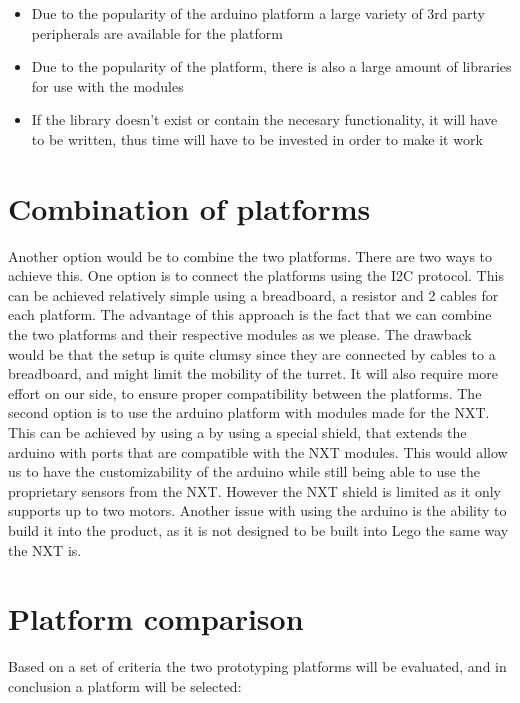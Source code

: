 \begin{itemize}
	\item Due to the popularity of the arduino platform a large variety of 3rd
	party peripherals are available for the platform \Source
	\item Due to the popularity of the platform, there is also a large amount of
	libraries for use with the modules \Source
	\item If the library doesn't exist or contain the necesary functionality, it
	will have to be written, thus time will have to be invested in order to make
	it work
\end{itemize}

\section{Combination of platforms}
Another option would be to combine the two platforms. There are two ways to achieve this.
One option is to connect the platforms using the I2C protocol. This can be achieved relatively
simple using a breadboard, a resistor and 2 cables for each platform. The advantage of this
approach is the fact that we can combine the two platforms and their respective modules as we please.
The drawback would be that the setup is quite clumsy since they are connected by cables to a breadboard,
and might limit the mobility of the turret. It will also require more effort on our side, to ensure proper
compatibility between the platforms.
The second option is to use the arduino platform with modules made for the NXT.
This can be achieved by using a by using a special shield, that extends the arduino with
ports that are compatible with the NXT modules. This would allow us to have the customizability of the arduino
while still being able to use the proprietary sensors from the NXT. However the
NXT shield is limited as it only supports up to two motors. Another issue with
using the arduino is the ability to build it into the product, as it is not
designed to be built into Lego the same way the NXT is.\nl

\section{Platform comparison}
Based on a set of criteria the two prototyping platforms will be evaluated, and
in conclusion a platform will be selected:

